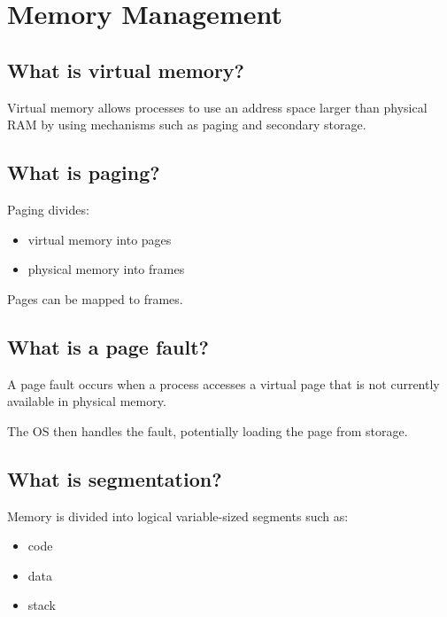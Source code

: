 \medskip

\section{Memory Management}

\subsection{What is virtual memory?}

Virtual memory allows processes to use an address space larger than physical RAM by using mechanisms such as paging and secondary storage.

\medskip

\subsection{What is paging?}

Paging divides:

\begin{itemize}
  \item virtual memory into pages
  \item physical memory into frames
\end{itemize}

Pages can be mapped to frames.

\medskip

\subsection{What is a page fault?}

A page fault occurs when a process accesses a virtual page that is not currently available in physical memory.

The OS then handles the fault, potentially loading the page from storage.

\medskip

\subsection{What is segmentation?}

Memory is divided into logical variable-sized segments such as:

\begin{itemize}
  \item code
  \item data
  \item stack
\end{itemize}


